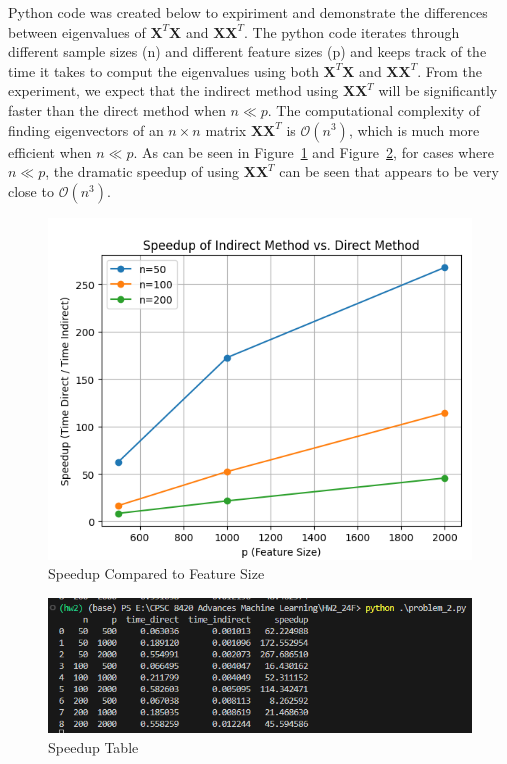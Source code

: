 \documentclass[11pt]{article}
\newcommand{\mtx}[1]{\mathbf{#1}}
\def \mX {\mtx{X}}
\begin{document}
	Python code was created below to expiriment and demonstrate the differences between eigenvalues of $\mX^T\mX$ and $\mX\mX^T$.
	The python code iterates through different sample sizes (n) and different feature sizes (p) and keeps track of the time it takes
	to comput the eigenvalues using both $\mX^T\mX$ and $\mX\mX^T$. From the experiment, we expect that the indirect method using $\mathbf{X} \mathbf{X}^T$ 
	will be significantly faster than the direct method when $n \ll p$. The computational complexity of finding eigenvectors of 
	an $n \times n$ matrix $\mathbf{X} \mathbf{X}^T$ is $\mathcal{O}(n^3)$, which is much more efficient when $n \ll p$.
	As can be seen in Figure~\ref{fig:speedup_graph} and Figure~\ref{fig:speedup_table}, for cases where $n\ll p$, 
	the dramatic speedup of using $\mX\mX^T$ can be seen that appears to be very close to $\mathcal{O}(n^3)$.
	
	\begin{figure}[htbp]
    	\centering
    	\includegraphics[width=\textwidth]{figures/problem2_graph.png}
    	\caption{Speedup Compared to Feature Size}
		\label{fig:speedup_graph}
	\end{figure}

	\begin{figure}[htbp]
    	\centering
    	\includegraphics[width=\textwidth]{figures/problem2_table.png}
    	\caption{Speedup Table}
		\label{fig:speedup_table}
	\end{figure}
	
\end{document}
